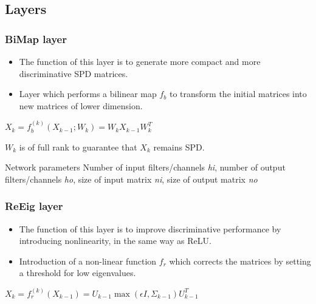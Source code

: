 \documentclass{beamer}
\begin{document}
\subsection{Layers}

\begin{frame}
\frametitle{BiMap layer}
\begin{itemize}
    \item The function of this layer is to generate more compact and more discriminative SPD matrices.
    \item Layer which performs a bilinear map $f_b$ to transform the initial matrices into new matrices of lower dimension.
\end{itemize}

\begin{center}
    $ X_k = f_b^{(k)}(X_{k-1};W_k)=W_kX_{k-1}W_k^T$
\end{center}

$W_k$ is of full rank to guarantee that $X_k$ remains SPD.

\begin{block}{Network parameters}
    Number of input filters/channels \textit{hi}, number of output filters/channels \textit{ho}, size of input matrix \textit{ni}, size of output matrix \textit{no}
\end{block}


\end{frame}
\begin{frame}
\frametitle{ReEig layer}
\begin{itemize}
    \item The function of this layer is to improve discriminative performance by introducing nonlinearity, in the same way as ReLU.
    \item Introduction of a non-linear function $f_r$ which corrects the matrices by setting a threshold for low eigenvalues.
\end{itemize}

\begin{center}
    $ X_k = f_r^{(k)}(X_{k-1})=U_{k-1}\max(\epsilon I, \Sigma_{k-1})U_{k-1}^T$
\end{center}

\end{frame}
\end{document}
